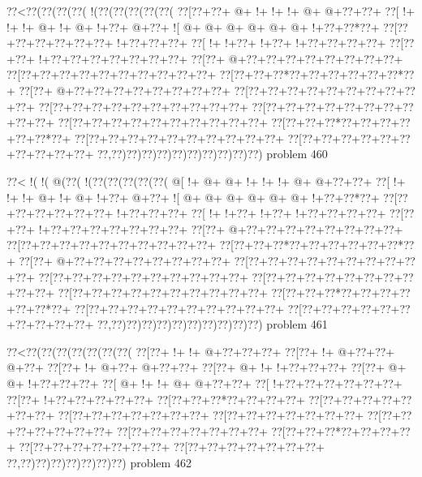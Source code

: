 \vbox{\vbox{\goo
\0??<\0??(\0??(\0??(\0??(\- !(\0??(\0??(\0??(\0??(\0??(
\0??[\0??+\0??+\- @+\- !+\- !+\- !+\- @+\- @+\0??+\0??+
\0??[\- !+\- !+\- !+\- @+\- !+\- @+\- !+\0??+\- @+\0??+
\- ![\- @+\- @+\- @+\- @+\- @+\- @+\- !+\0??+\0??*\0??+
\0??[\0??+\0??+\0??+\0??+\0??+\0??+\- !+\0??+\0??+\0??+
\0??[\- !+\- !+\0??+\- !+\0??+\- !+\0??+\0??+\0??+\0??+
\0??[\0??+\0??+\- !+\0??+\0??+\0??+\0??+\0??+\0??+\0??+
\0??[\0??+\- @+\0??+\0??+\0??+\0??+\0??+\0??+\0??+\0??+
\0??[\0??+\0??+\0??+\0??+\0??+\0??+\0??+\0??+\0??+\0??+
\0??[\0??+\0??+\0??*\0??+\0??+\0??+\0??+\0??+\0??*\0??+
\0??[\0??+\- @+\0??+\0??+\0??+\0??+\0??+\0??+\0??+\0??+
\0??[\0??+\0??+\0??+\0??+\0??+\0??+\0??+\0??+\0??+\0??+
\0??[\0??+\0??+\0??+\0??+\0??+\0??+\0??+\0??+\0??+\0??+
\0??[\0??+\0??+\0??+\0??+\0??+\0??+\0??+\0??+\0??+\0??+
\0??[\0??+\0??+\0??+\0??+\0??+\0??+\0??+\0??+\0??+\0??+
\0??[\0??+\0??+\0??*\0??+\0??+\0??+\0??+\0??+\0??*\0??+
\0??[\0??+\0??+\0??+\0??+\0??+\0??+\0??+\0??+\0??+\0??+
\0??[\0??+\0??+\0??+\0??+\0??+\0??+\0??+\0??+\0??+\0??+
\0??,\0??)\0??)\0??)\0??)\0??)\0??)\0??)\0??)\0??)\0??)
}
\hfil problem 460\hfil\break
}

\vbox{\vbox{\goo
\0??<\- !(\- !(\- @(\0??(\- !(\0??(\0??(\0??(\0??(\0??(
\- @[\- !+\- @+\- @+\- !+\- !+\- !+\- @+\- @+\0??+\0??+
\0??[\- !+\- !+\- !+\- @+\- !+\- @+\- !+\0??+\- @+\0??+
\- ![\- @+\- @+\- @+\- @+\- @+\- @+\- !+\0??+\0??*\0??+
\0??[\0??+\0??+\0??+\0??+\0??+\0??+\- !+\0??+\0??+\0??+
\0??[\- !+\- !+\0??+\- !+\0??+\- !+\0??+\0??+\0??+\0??+
\0??[\0??+\0??+\- !+\0??+\0??+\0??+\0??+\0??+\0??+\0??+
\0??[\0??+\- @+\0??+\0??+\0??+\0??+\0??+\0??+\0??+\0??+
\0??[\0??+\0??+\0??+\0??+\0??+\0??+\0??+\0??+\0??+\0??+
\0??[\0??+\0??+\0??*\0??+\0??+\0??+\0??+\0??+\0??*\0??+
\0??[\0??+\- @+\0??+\0??+\0??+\0??+\0??+\0??+\0??+\0??+
\0??[\0??+\0??+\0??+\0??+\0??+\0??+\0??+\0??+\0??+\0??+
\0??[\0??+\0??+\0??+\0??+\0??+\0??+\0??+\0??+\0??+\0??+
\0??[\0??+\0??+\0??+\0??+\0??+\0??+\0??+\0??+\0??+\0??+
\0??[\0??+\0??+\0??+\0??+\0??+\0??+\0??+\0??+\0??+\0??+
\0??[\0??+\0??+\0??*\0??+\0??+\0??+\0??+\0??+\0??*\0??+
\0??[\0??+\0??+\0??+\0??+\0??+\0??+\0??+\0??+\0??+\0??+
\0??[\0??+\0??+\0??+\0??+\0??+\0??+\0??+\0??+\0??+\0??+
\0??,\0??)\0??)\0??)\0??)\0??)\0??)\0??)\0??)\0??)\0??)
}
\hfil problem 461\hfil\break
}

\vbox{\vbox{\goo
\0??<\0??(\0??(\0??(\0??(\0??(\0??(\0??(
\0??[\0??+\- !+\- !+\- @+\0??+\0??+\0??+
\0??[\0??+\- !+\- @+\0??+\0??+\- @+\0??+
\0??[\0??+\- !+\- @+\0??+\- @+\0??+\0??+
\0??[\0??+\- @+\- !+\- !+\0??+\0??+\0??+
\0??[\0??+\- @+\- @+\- !+\0??+\0??+\0??+
\0??[\- @+\- !+\- !+\- @+\- @+\0??+\0??+
\0??[\- !+\0??+\0??+\0??+\0??+\0??+\0??+
\0??[\0??+\- !+\0??+\0??+\0??+\0??+\0??+
\0??[\0??+\0??+\0??*\0??+\0??+\0??+\0??+
\0??[\0??+\0??+\0??+\0??+\0??+\0??+\0??+
\0??[\0??+\0??+\0??+\0??+\0??+\0??+\0??+
\0??[\0??+\0??+\0??+\0??+\0??+\0??+\0??+
\0??[\0??+\0??+\0??+\0??+\0??+\0??+\0??+
\0??[\0??+\0??+\0??+\0??+\0??+\0??+\0??+
\0??[\0??+\0??+\0??*\0??+\0??+\0??+\0??+
\0??[\0??+\0??+\0??+\0??+\0??+\0??+\0??+
\0??[\0??+\0??+\0??+\0??+\0??+\0??+\0??+
\0??,\0??)\0??)\0??)\0??)\0??)\0??)\0??)
}
\hfil problem 462\hfil\break
}

